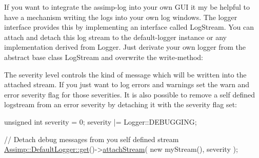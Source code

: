 If you want to integrate the assimp-\/log into your own G\+U\+I it my be helpful to have a mechanism writing the logs into your own log windows. The logger interface provides this by implementing an interface called Log\+Stream. You can attach and detach this log stream to the default-\/logger instance or any implementation derived from Logger. Just derivate your own logger from the abstract base class Log\+Stream and overwrite the write-\/method\+:




The severity level controls the kind of message which will be written into the attached stream. If you just want to log errors and warnings set the warn and error severity flag for those severities. It is also possible to remove a self defined logstream from an error severity by detaching it with the severity flag set\+:


\begin{DoxyCode}
\textcolor{keywordtype}{unsigned} \textcolor{keywordtype}{int} severity = 0;
severity |= Logger::DEBUGGING;

\textcolor{comment}{// Detach debug messages from you self defined stream}
\hyperlink{class_assimp_1_1_default_logger_a093cac26b06553ac774f84769cb0d691}{Assimp::DefaultLogger::get}()->\hyperlink{class_assimp_1_1_logger_aaf32a42b02a7e227076013d01e349871}{attachStream}( \textcolor{keyword}{new} myStream(), severity 
      );
\end{DoxyCode}


